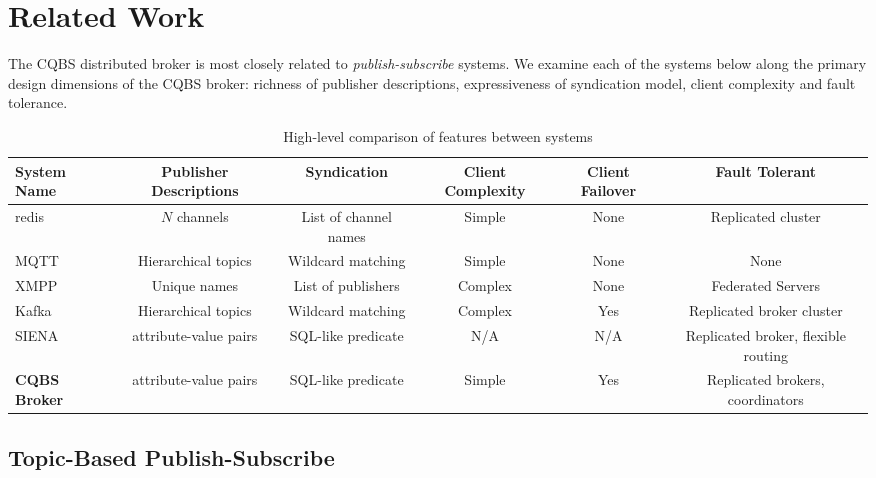 \section{Related Work}


The CQBS distributed broker is most closely related to \emph{publish-subscribe} systems.
We examine each of the systems below along the primary design dimensions of the CQBS broker: richness of publisher descriptions, expressiveness of syndication model, client complexity and fault tolerance.

\begin{table*}
\caption{High-level comparison of features between systems}
\label{table:comparison}
\centering
\begin{tabular}{|l|c|c|c|c|c|}
\hline
\textbf{System Name} & \textbf{Publisher Descriptions} & \textbf{Syndication} & \textbf{Client Complexity} & \textbf{Client Failover} & \textbf{Fault Tolerant} \\
\hline \hline
redis~\cite{redis} & $N$ channels & List of channel names & Simple & None & Replicated cluster \\
MQTT~\cite{locke2010mq}\cite{hunkeler2008mqtt} & Hierarchical topics & Wildcard matching & Simple & None & None \\
XMPP~\cite{saint2011extensible} & Unique names & List of publishers & Complex & None & Federated Servers \\
Kafka~\cite{kreps2011kafka} & Hierarchical topics & Wildcard matching & Complex & Yes & Replicated broker cluster \\
SIENA~\cite{carzaniga2000achieving} & attribute-value pairs & SQL-like predicate & N/A & N/A & Replicated broker, flexible routing \\
\textbf{CQBS Broker} & attribute-value pairs & SQL-like predicate & Simple & Yes & Replicated brokers, coordinators \\
\hline
\end{tabular}
\end{table*}

\subsection{Topic-Based Publish-Subscribe}

